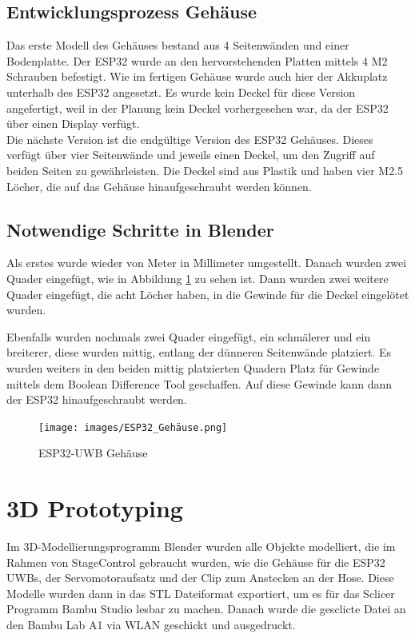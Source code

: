\newpage
\subsection{Entwicklungsprozess Gehäuse}
Das erste Modell des Gehäuses bestand aus 4 Seitenwänden und einer Bodenplatte. Der ESP32 wurde an den hervorstehenden Platten mittels 4 M2 Schrauben befestigt. Wie im fertigen Gehäuse wurde auch hier der Akkuplatz unterhalb des ESP32 angesetzt. Es wurde kein Deckel für diese Version angefertigt, weil in der Planung kein Deckel vorhergesehen war, da der ESP32 über einen Display verfügt. \\
Die nächste Version ist die endgültige Version des ESP32 Gehäuses. Dieses verfügt über vier Seitenwände und jeweils einen Deckel, um den Zugriff auf beiden Seiten zu gewährleisten. Die Deckel sind aus Plastik und haben vier M2.5 Löcher, die auf das Gehäuse hinaufgeschraubt werden können.

\subsection{Notwendige Schritte in Blender}
Als erstes wurde wieder von Meter in Millimeter umgestellt. Danach wurden zwei Quader eingefügt, wie in Abbildung \ref{Gehäuse} zu sehen ist. Dann wurden zwei weitere Quader eingefügt, die acht Löcher haben, in die Gewinde für die Deckel eingelötet wurden.

Ebenfalls wurden nochmals zwei Quader eingefügt, ein schmälerer und ein breiterer, diese wurden mittig, entlang der dünneren Seitenwände platziert. Es wurden weiters in den beiden mittig platzierten Quadern Platz für Gewinde mittels dem Boolean Difference Tool geschaffen. Auf diese Gewinde kann dann der ESP32 hinaufgeschraubt werden.


\begin{figure}[H]
	\centering
	\texttt{[image: images/ESP32\_Gehäuse.png]}
	\caption[ESP32-UWB Gehäuse]{ESP32-UWB Gehäuse}
	\label{fig:ESP32-UWB Gehäuse}
	\label{Gehäuse}
\end{figure}

\newpage
\section{3D Prototyping}
Im 3D-Modellierungsprogramm Blender wurden alle Objekte modelliert, die im Rahmen von StageControl gebraucht wurden, wie die Gehäuse für die ESP32 UWBs, der Servomotoraufsatz und der Clip zum Anstecken an der Hose. Diese Modelle wurden dann in das STL Dateiformat exportiert, um es für das Sclicer Programm Bambu Studio lesbar zu machen. Danach wurde die gesclicte Datei an den Bambu Lab A1 via WLAN geschickt und ausgedruckt.

